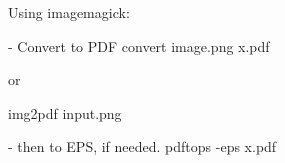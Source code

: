 Using imagemagick:

- Convert to PDF 
convert image.png x.pdf

or

img2pdf input.png

- then to EPS, if needed.
pdftops -eps x.pdf
